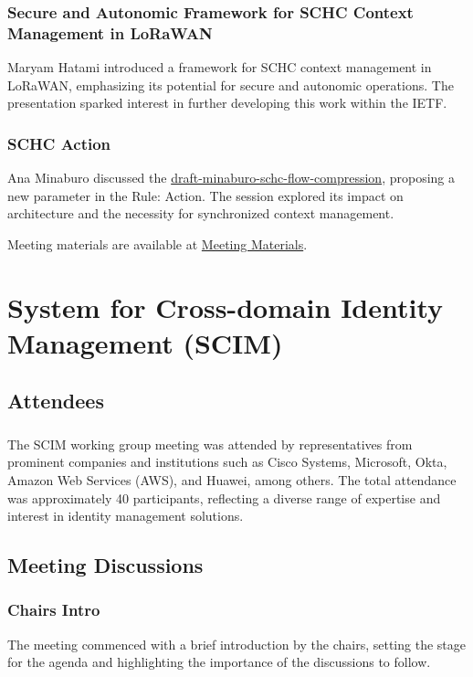 \documentclass{article}
\begin{document}
\subsubsection{Secure and Autonomic Framework for SCHC Context Management in LoRaWAN}
Maryam Hatami introduced a framework for SCHC context management in LoRaWAN, emphasizing its potential for secure and autonomic operations. The presentation sparked interest in further developing this work within the IETF.

\subsubsection{SCHC Action}
Ana Minaburo discussed the \href{https://datatracker.ietf.org/doc/html/draft-minaburo-schc-flow-compression}{draft-minaburo-schc-flow-compression}, proposing a new parameter in the Rule: Action. The session explored its impact on architecture and the necessity for synchronized context management.

Meeting materials are available at \href{https://datatracker.ietf.org/meeting/121/session/schc}{Meeting Materials}.




\newpage

\section{System for Cross-domain Identity Management (SCIM)}

\subsection{Attendees}
\subsubsection{}
The SCIM working group meeting was attended by representatives from prominent companies and institutions such as Cisco Systems, Microsoft, Okta, Amazon Web Services (AWS), and Huawei, among others. The total attendance was approximately 40 participants, reflecting a diverse range of expertise and interest in identity management solutions.

\subsection{Meeting Discussions}

\subsubsection{Chairs Intro}
The meeting commenced with a brief introduction by the chairs, setting the stage for the agenda and highlighting the importance of the discussions to follow.
\end{document}
